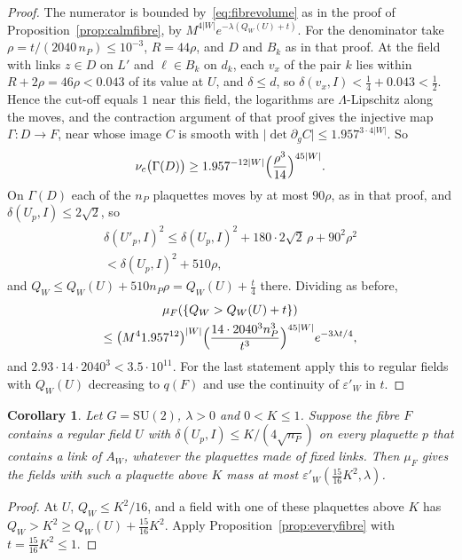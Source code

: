 \documentclass[11pt]{amsart}
\newtheorem{corollary}[theorem]{Corollary}
\theoremstyle{definition}
\theoremstyle{remark}
\numberwithin{equation}{section}
\newcommand{\SU}{\mathrm{SU}}
\begin{document}
\begin{proof}
The numerator is bounded by~\eqref{eq:fibrevolume} as in the proof of
Proposition~\ref{prop:calmfibre}, by $M^{4|W|}e^{-\lambda(Q_W(U)+t)}$. For
the denominator take $\rho=t/(2040\,n_P)\le10^{-3}$, $R=44\rho$, and $D$ and
$B_k$ as in that proof. At the field with links $z\in D$ on $L'$ and $\ell\in
B_k$ on $d_k$, each $v_x$ of the pair $k$ lies within $R+2\rho=46\rho<0.043$
of its value at $U$, and $\delta\le d$, so $\delta(v_x,I)<\frac14+0.043<
\frac12$. Hence the cut-off equals $1$ near this field, the logarithms are
$\Lambda$-Lipschitz along the moves, and the contraction argument of that
proof gives the injective map $\Gamma:D\to F$, near whose image $C$ is smooth
with $\lvert\det\partial_gC\rvert\le1.957^{3\cdot4|W|}$. So
\[
\nu_c\bigl(\Gamma(D)\bigr)\ge1.957^{-12|W|}\Bigl(\frac{\rho^3}{14}\Bigr)
^{45|W|}.
\]
On $\Gamma(D)$ each of the $n_P$ plaquettes moves by at most $90\rho$, as in that proof, and
$\delta(U_p,I)\le2\sqrt2$, so
\begin{multline*}
\delta(U'_p,I)^2\le\delta(U_p,I)^2+180\cdot2\sqrt2\,\rho+90^2\rho^2\\
<\delta(U_p,I)^2+510\rho,
\end{multline*}
and $Q_W\le Q_W(U)+510n_P\rho=Q_W(U)+\frac t4$ there. Dividing as before,
\begin{multline*}
\mu_F(\{Q_W>Q_W(U)+t\})\\
\le\bigl(M^41.957^{12}\bigr)^{|W|}\Bigl(\frac{14\cdot2040^3n_P^3}{t^3}
\Bigr)^{45|W|}e^{-3\lambda t/4},
\end{multline*}
and $2.93\cdot14\cdot2040^3<3.5\cdot10^{11}$. For the last statement apply
this to regular fields with $Q_W(U)$ decreasing to $q(F)$ and use the
continuity of $\varepsilon'_W$ in $t$.
\end{proof}

\begin{corollary}\label{cor:everyfibre}
Let $G=\SU(2)$, $\lambda>0$ and $0<K\le1$. Suppose the fibre $F$ contains a
regular field $U$ with $\delta(U_p,I)\le K/(4\sqrt{n_P})$ on every plaquette
$p$ that contains a link of $A_W$, whatever the plaquettes made of fixed
links. Then $\mu_F$ gives the fields with such a plaquette above $K$ mass at
most $\varepsilon'_W(\frac{15}{16}K^2,\lambda)$.
\end{corollary}

\begin{proof}
At $U$, $Q_W\le K^2/16$, and a field with one of these plaquettes above $K$
has $Q_W>K^2\ge Q_W(U)+\frac{15}{16}K^2$. Apply
Proposition~\ref{prop:everyfibre} with $t=\frac{15}{16}K^2\le1$.
\end{proof}
\end{document}
